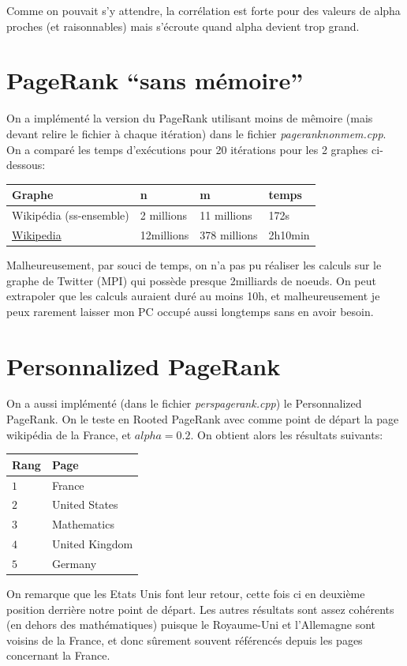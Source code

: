 \documentclass[a4paper]{report}
\begin{document}
Comme on pouvait s'y attendre, la corrélation est forte pour des valeurs de alpha proches (et raisonnables) mais s'écroute quand alpha devient trop grand.

\section{PageRank ``sans mémoire''}
On a implémenté la version du PageRank utilisant moins de mêmoire (mais devant relire le fichier à chaque itération) dans le fichier \textit{pageranknonmem.cpp}. On a comparé les temps d'exécutions pour 20 itérations pour les 2 graphes ci-dessous:
\begin{center}
  \begin{tabular}{|l|l|l|l|}
    \hline
    Graphe & n & m & temps\\
    \hline
    Wikipédia (ss-ensemble) & 2 millions & 11 millions & 172s\\
    \href{http://konect.uni-koblenz.de/networks/wikipedia_link_en}{Wikipedia} & 12millions & 378 millions & 2h10min\\
    \hline
  \end{tabular}
\end{center}
Malheureusement, par souci de temps, on n'a pas pu réaliser les calculs sur le graphe de Twitter (MPI) qui possède presque 2milliards de noeuds. On peut extrapoler que les calculs auraient duré au moins 10h, et malheureusement je peux rarement laisser mon PC occupé aussi longtemps sans en avoir besoin.

\section{Personnalized PageRank}
On a aussi implémenté (dans le fichier \textit{perspagerank.cpp}) le Personnalized PageRank. On le teste en Rooted PageRank avec comme point de départ la page wikipédia de la France, et $alpha = 0.2$. On obtient alors les résultats suivants:

\begin{center}
  \begin{tabular}{|l|l|}
    \hline
    Rang & Page\\
    \hline
    $1$ & France\\
    $2$ & United States\\
    $3$ & Mathematics\\
    $4$ & United Kingdom\\
    $5$ & Germany\\
    \hline
  \end{tabular}
\end{center}

On remarque que les Etats Unis font leur retour, cette fois ci en deuxième position derrière notre point de départ. Les autres résultats sont assez cohérents (en dehors des mathématiques) puisque le Royaume-Uni et l'Allemagne sont voisins de la France, et donc sûrement souvent référencés depuis les pages concernant la France.
\end{document}
